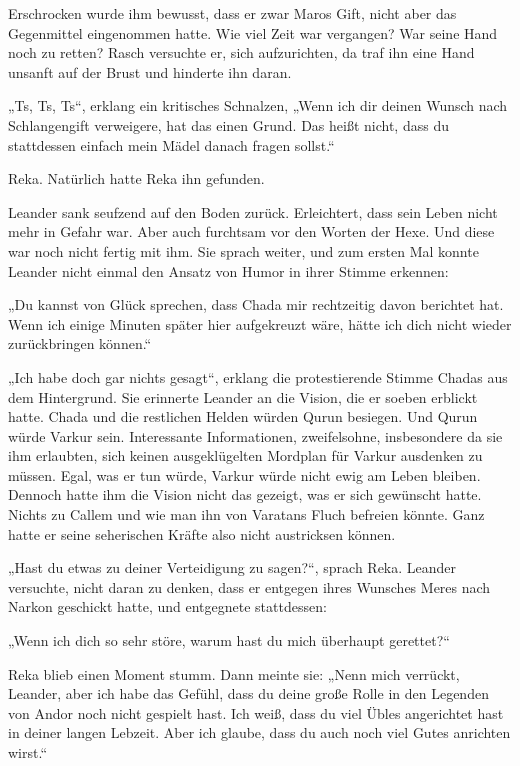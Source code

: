 Erschrocken wurde ihm bewusst, dass er zwar Maros Gift, nicht aber das Gegenmittel eingenommen hatte. Wie viel Zeit war vergangen? War seine Hand noch zu retten? Rasch versuchte er, sich aufzurichten, da traf ihn eine Hand unsanft auf der Brust und hinderte ihn daran.

„Ts, Ts, Ts“, erklang ein kritisches Schnalzen, „Wenn ich dir deinen Wunsch nach Schlangengift verweigere, hat das einen Grund. Das heißt nicht, dass du stattdessen einfach mein Mädel danach fragen sollst.“

Reka. Natürlich hatte Reka ihn gefunden.

Leander sank seufzend auf den Boden zurück. Erleichtert, dass sein Leben nicht mehr in Gefahr war. Aber auch furchtsam vor den Worten der Hexe. Und diese war noch nicht fertig mit ihm. Sie sprach weiter, und zum ersten Mal konnte Leander nicht einmal den Ansatz von Humor in ihrer Stimme erkennen:

„Du kannst von Glück sprechen, dass Chada mir rechtzeitig davon berichtet hat. Wenn ich einige Minuten später hier aufgekreuzt wäre, hätte ich dich nicht wieder zurückbringen können.“

„Ich habe doch gar nichts gesagt“, erklang die protestierende Stimme Chadas aus dem Hintergrund. Sie erinnerte Leander an die Vision, die er soeben erblickt hatte. Chada und die restlichen Helden würden Qurun besiegen. Und Qurun würde Varkur sein. Interessante Informationen, zweifelsohne, insbesondere da sie ihm erlaubten, sich keinen ausgeklügelten Mordplan für Varkur ausdenken zu müssen. Egal, was er tun würde, Varkur würde nicht ewig am Leben bleiben. Dennoch hatte ihm die Vision nicht das gezeigt, was er sich gewünscht hatte. Nichts zu Callem und wie man ihn von Varatans Fluch befreien könnte. Ganz hatte er seine seherischen Kräfte also nicht austricksen können.

„Hast du etwas zu deiner Verteidigung zu sagen?“, sprach Reka. Leander versuchte, nicht daran zu denken, dass er entgegen ihres Wunsches Meres nach Narkon geschickt hatte, und entgegnete stattdessen:

„Wenn ich dich so sehr störe, warum hast du mich überhaupt gerettet?“

Reka blieb einen Moment stumm. Dann meinte sie: „Nenn mich verrückt, Leander, aber ich habe das Gefühl, dass du deine große Rolle in den Legenden von Andor noch nicht gespielt hast. Ich weiß, dass du viel Übles angerichtet hast in deiner langen Lebzeit. Aber ich glaube, dass du auch noch viel Gutes anrichten wirst.“

